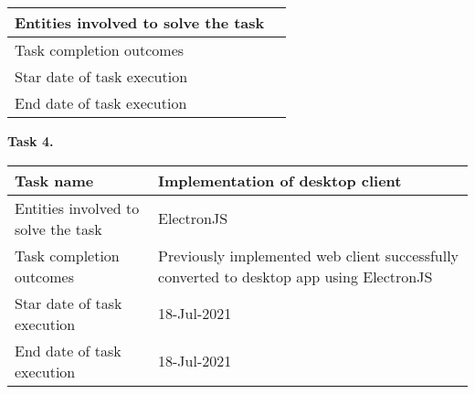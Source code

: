 \begin{description}
\begin{tabular}{|p{}|p{}|}
        \hline
        Entities involved to solve the task &                                     \\
        \hline
        Task completion outcomes            &                                     \\
        \hline
        Star date of task execution         &                                     \\
        \hline
        End date of task execution          &                                     \\
        \hline
    \end{tabular}
    \item \hspace*{8mm}\textbf{Task 4.}\\
    \begin{tabular}{|p{}|p{}|}
        \hline
        Task name                           & Implementation of desktop client                                                         \\
        \hline
        Entities involved to solve the task & ElectronJS                                                                               \\
        \hline
        Task completion outcomes            & Previously implemented web client successfully converted to desktop app using ElectronJS \\
        \hline
        Star date of task execution         & 18-Jul-2021                                                                              \\
        \hline
        End date of task execution          & 18-Jul-2021                                                                              \\
        \hline
    \end{tabular}
\end{description}